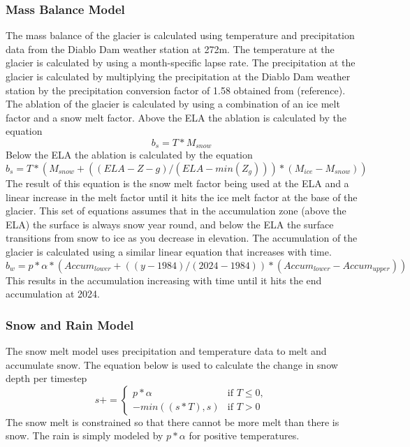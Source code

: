 \documentclass{article}
\begin{document}
\subsubsection{Mass Balance Model}
The mass balance of the glacier is calculated using temperature and precipitation data from the Diablo Dam weather station at 272m. The 
temperature at the glacier is calculated by using a month-specific lapse rate. 
The precipitation at the glacier is calculated by multiplying the precipitation at the Diablo Dam weather station by the precipitation conversion factor of 1.58 
obtained from (reference). The ablation of the glacier is calculated by using a combination of an ice melt factor and a snow melt factor. Above the ELA the 
ablation is calculated by the equation
\begin{equation}b_s=T*M_{snow}\end{equation}
Below the ELA the ablation is calculated by the equation
\begin{equation}b_s=T*(M_{snow}+((ELA-Z-g)/(ELA-min(Z_g)))*(M_{ice}-M_{snow}))\end{equation}
The result of this equation is the snow melt factor being used at the ELA and a linear increase in the melt factor until it hits the ice melt 
factor at the base of the glacier. This set of equations assumes that in the accumulation zone (above the ELA) the surface is always snow year 
round, and below the ELA the surface transitions from snow to ice as you decrease in elevation.
The accumulation of the glacier is calculated using a similar linear equation that increases with time.
\begin{equation}b_w=p*\alpha*({Accum}_{lower}+((y-1984)/(2024-1984))*({Accum}_{lower}-{Accum}_{upper}))\end{equation}
This results in the accumulation increasing with time until it hits the end accumulation at 2024. 

\subsubsection{Snow and Rain Model}
The snow melt model uses precipitation and temperature data to melt and accumulate snow. 
The equation below is used to calculate the change in snow depth per timestep 
\begin{equation}s += 
\begin{cases} 
  p*\alpha & \text{if } T \leq 0,\\
  -min((s*T),s) & \text{if } T > 0
\end{cases}\end{equation}
The snow melt is constrained so that there cannot be more melt than there is snow. The rain is simply modeled by $p*\alpha$ for positive 
temperatures.
\end{document}
